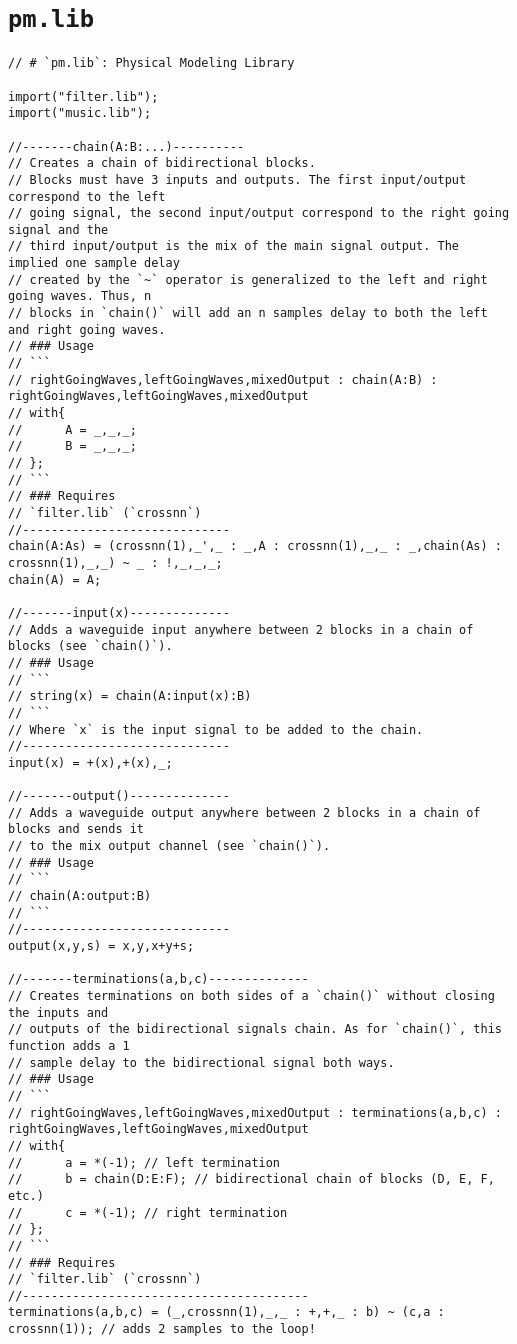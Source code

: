 \chapter{\texttt{pm.lib}}

\begin{lstlisting}
// # `pm.lib`: Physical Modeling Library

import("filter.lib");
import("music.lib");

//-------chain(A:B:...)----------
// Creates a chain of bidirectional blocks. 
// Blocks must have 3 inputs and outputs. The first input/output correspond to the left 
// going signal, the second input/output correspond to the right going signal and the 
// third input/output is the mix of the main signal output. The implied one sample delay
// created by the `~` operator is generalized to the left and right going waves. Thus, n
// blocks in `chain()` will add an n samples delay to both the left and right going waves.
// ### Usage
// ```
// rightGoingWaves,leftGoingWaves,mixedOutput : chain(A:B) : rightGoingWaves,leftGoingWaves,mixedOutput
// with{
// 		A = _,_,_;
//		B = _,_,_;
// };
// ```
// ### Requires
// `filter.lib` (`crossnn`)
//-----------------------------
chain(A:As) = (crossnn(1),_',_ : _,A : crossnn(1),_,_ : _,chain(As) : crossnn(1),_,_) ~ _ : !,_,_,_;
chain(A) = A;

//-------input(x)--------------
// Adds a waveguide input anywhere between 2 blocks in a chain of blocks (see `chain()`).
// ### Usage
// ```
// string(x) = chain(A:input(x):B)
// ```
// Where `x` is the input signal to be added to the chain. 
//-----------------------------
input(x) = +(x),+(x),_;

//-------output()--------------
// Adds a waveguide output anywhere between 2 blocks in a chain of blocks and sends it 
// to the mix output channel (see `chain()`).
// ### Usage
// ```
// chain(A:output:B)
// ```
//-----------------------------
output(x,y,s) = x,y,x+y+s;

//-------terminations(a,b,c)--------------
// Creates terminations on both sides of a `chain()` without closing the inputs and 
// outputs of the bidirectional signals chain. As for `chain()`, this function adds a 1
// sample delay to the bidirectional signal both ways.
// ### Usage
// ```
// rightGoingWaves,leftGoingWaves,mixedOutput : terminations(a,b,c) : rightGoingWaves,leftGoingWaves,mixedOutput
// with{
//		a = *(-1); // left termination
//		b = chain(D:E:F); // bidirectional chain of blocks (D, E, F, etc.)
//		c = *(-1); // right termination
// };
// ```  
// ### Requires
// `filter.lib` (`crossnn`)
//----------------------------------------
terminations(a,b,c) = (_,crossnn(1),_,_ : +,+,_ : b) ~ (c,a : crossnn(1)); // adds 2 samples to the loop!


\end{lstlisting}
